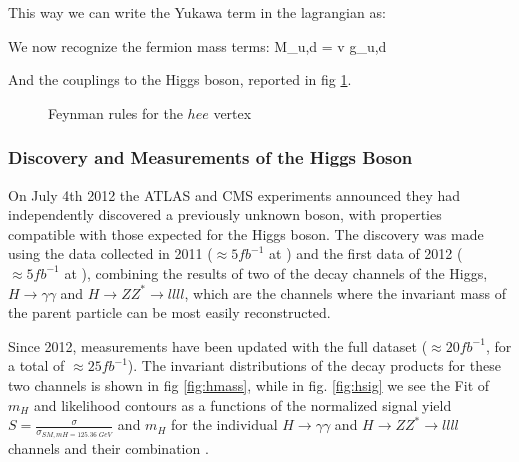 This way we can write the Yukawa term in the lagrangian as:

We now recognize the fermion mass terms:
\beq
M_{u,d} =   v g_{u,d}
\eeq

And the couplings to the Higgs boson, reported in fig \ref{fig:hee}.

\begin{figure}
\begin{center}
\end{center}
\caption[Feynman rules for the $hee$ vertex]{Feynman rules for the $hee$ vertex}
\label{fig:hee}
\end{figure}


\subsubsection{Discovery and Measurements of the Higgs Boson}

On July 4th 2012 the ATLAS and CMS experiments announced they had independently discovered a previously unknown boson, with properties compatible with those expected for the Higgs boson. The discovery was made using the data collected in 2011 ($\approx 5 fb^{-1}$ at \cmsette) and the first data of 2012 ($\approx 5 fb^{-1}$ at \cmotto), combining the results of two of the decay channels of the Higgs, $H \rightarrow \gamma \gamma $ and $H \rightarrow Z Z^* \rightarrow llll $, which are the channels where the invariant mass of the parent particle can be most easily reconstructed. 

Since 2012, measurements have been updated with the full \cmotto dataset ($\approx 20 fb^{-1}$, for a total of $\approx 25 fb^{-1}$). The invariant distributions of the decay products for these two channels is shown in fig \ref{fig:hmass}, while in fig. \ref{fig:hsig} we see the Fit of $m_H$ and likelihood contours as a functions of the normalized signal yield $S= \frac{\sigma}{\sigma_{SM,mH = 125.36 \; GeV}}$ and $m_H$ for the individual $H \rightarrow \gamma \gamma $ and $H \rightarrow Z Z^* \rightarrow llll $ channels and their combination \cite{atlas:hmass}.

